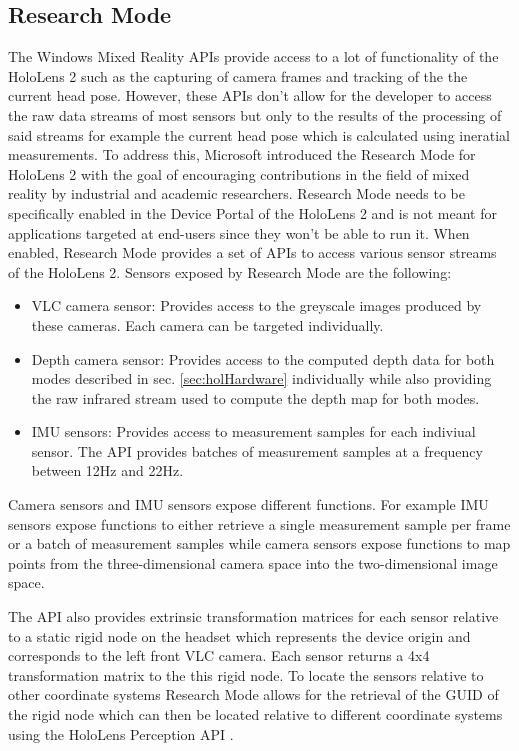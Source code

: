 \subsection{Research Mode} \label{sec:ResearchMode}

The Windows Mixed Reality APIs \cite{DocMixedReality} provide access to a lot of functionality of the HoloLens 2 such as the capturing of camera frames and tracking of the the current head pose. However, these APIs don't allow for the developer to access the raw data streams of most sensors but only to the results of the processing of said streams for example the current head pose which is calculated using ineratial measurements. To address this, Microsoft introduced the Research Mode for HoloLens 2 \cite{ResearchMode} with the goal of encouraging contributions in the field of mixed reality by industrial and academic researchers. Research Mode needs to be specifically enabled in the Device Portal of the HoloLens 2 \cite{DevicePortal} and is not meant for applications targeted at end-users since they won't be able to run it. When enabled, Research Mode provides a set of \Cpp APIs to access various sensor streams of the HoloLens 2. Sensors exposed by Research Mode are the following:

\begin{itemize}
    \item VLC camera sensor: Provides access to the greyscale images produced by these cameras. Each camera can be targeted individually.
    \item Depth camera sensor: Provides access to the computed depth data for both modes described in sec. \ref{sec:holHardware} individually while also providing the raw infrared stream used to compute the depth map for both modes.
    \item IMU sensors: Provides access to measurement samples for each indiviual sensor. The API provides batches of measurement samples at a frequency between 12Hz and 22Hz.
\end{itemize}

Camera sensors and IMU sensors expose different functions. For example IMU sensors expose functions to either retrieve a single measurement sample per frame or a batch of measurement samples while camera sensors expose functions to map points from the three-dimensional camera space into the two-dimensional image space.

The API also provides extrinsic transformation matrices for each sensor relative to a static rigid node on the headset which represents the device origin and corresponds to the left front VLC camera. Each sensor returns a 4x4 transformation matrix to the this rigid node. To locate the sensors relative to other coordinate systems Research Mode allows for the retrieval of the GUID of the rigid node which can then be located relative to different coordinate systems using the HoloLens Perception API \cite{HololensPerception}. 

